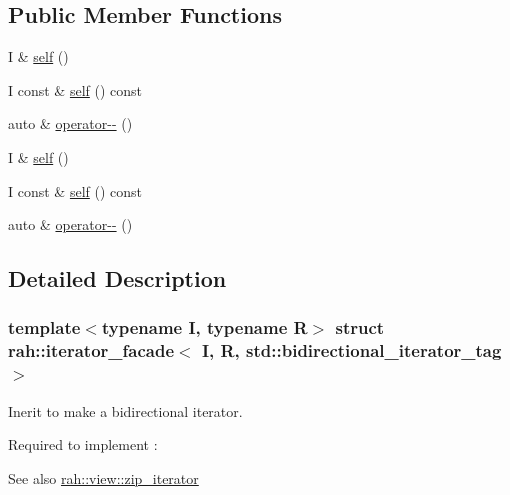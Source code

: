 \subsection*{Public Member Functions}
\begin{DoxyCompactItemize}
\item 
I \& \mbox{\hyperlink{structrah_1_1iterator__facade_3_01_i_00_01_r_00_01std_1_1bidirectional__iterator__tag_01_4_ae9bfe3425019c0ffb9156f298cba2980}{self}} ()
\item 
I const  \& \mbox{\hyperlink{structrah_1_1iterator__facade_3_01_i_00_01_r_00_01std_1_1bidirectional__iterator__tag_01_4_ae2156f4940ef87b6852ff7abe52002c9}{self}} () const
\item 
auto \& \mbox{\hyperlink{structrah_1_1iterator__facade_3_01_i_00_01_r_00_01std_1_1bidirectional__iterator__tag_01_4_aa75167b7030dfb55cbf7146b4e9f164f}{operator-\/-\/}} ()
\item 
I \& \mbox{\hyperlink{structrah_1_1iterator__facade_3_01_i_00_01_r_00_01std_1_1bidirectional__iterator__tag_01_4_ae9bfe3425019c0ffb9156f298cba2980}{self}} ()
\item 
I const  \& \mbox{\hyperlink{structrah_1_1iterator__facade_3_01_i_00_01_r_00_01std_1_1bidirectional__iterator__tag_01_4_ae2156f4940ef87b6852ff7abe52002c9}{self}} () const
\item 
auto \& \mbox{\hyperlink{structrah_1_1iterator__facade_3_01_i_00_01_r_00_01std_1_1bidirectional__iterator__tag_01_4_aa75167b7030dfb55cbf7146b4e9f164f}{operator-\/-\/}} ()
\end{DoxyCompactItemize}


\subsection{Detailed Description}
\subsubsection*{template$<$typename I, typename R$>$\newline
struct rah\+::iterator\+\_\+facade$<$ I, R, std\+::bidirectional\+\_\+iterator\+\_\+tag $>$}

Inerit to make a bidirectional iterator. 

Required to implement \+: 
\begin{DoxyCode}{0}
\end{DoxyCode}
 \begin{DoxySeeAlso}{See also}
\mbox{\hyperlink{structrah_1_1view_1_1zip__iterator}{rah\+::view\+::zip\+\_\+iterator}} 
\end{DoxySeeAlso}


